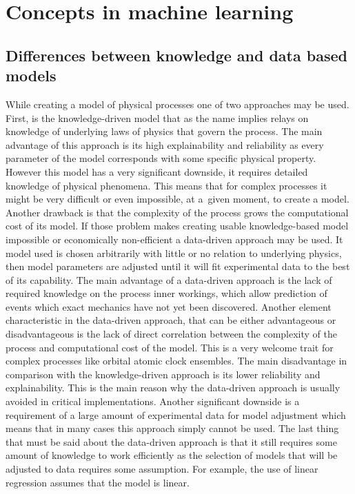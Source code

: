 \FloatBarrier
\section{Concepts in machine learning}

\FloatBarrier
\subsection{Differences between knowledge and data based models}
While creating a model of physical processes one of two approaches may be used.
First, is the knowledge-driven model that as the name implies relays on knowledge of underlying
laws of physics that govern the process.
The main advantage of this approach is its high explainability and reliability as every parameter
of the model corresponds with some specific physical property.
However this model has a very significant downside, it requires detailed knowledge of physical
phenomena. This means that for complex processes it might be very difficult or even
impossible, at a~given moment, to create a model. Another drawback is that the complexity of
the process grows the computational cost of its model.
If those problem makes creating usable knowledge-based model impossible or economically
non-efficient a data-driven approach may be used.
It model used is chosen arbitrarily with little or no relation to underlying physics,
then model parameters are adjusted until it will fit experimental data to the best of its
capability.
The main advantage of a data-driven approach is the lack of required knowledge on the process
inner workings, which allow prediction of events which exact mechanics have not
yet been discovered.
Another element characteristic in the data-driven approach, that can be either advantageous or
disadvantageous is the lack of direct correlation between the complexity
of the process and computational cost of the model.
This is a very welcome trait for complex processes like orbital atomic clock ensembles.
The main disadvantage in comparison with the knowledge-driven approach is its 
lower reliability and explainability. 
This is the main reason why the data-driven approach is usually avoided in
critical implementations. Another significant downside is a requirement of a large amount of
experimental data for model adjustment which means that in many cases this approach simply
cannot be used.
The last thing that must be said about the data-driven approach is that it still requires some
amount of knowledge to work efficiently as the selection of models that will be adjusted to
data requires some assumption. For example, the use of linear regression assumes that the model
is linear.

